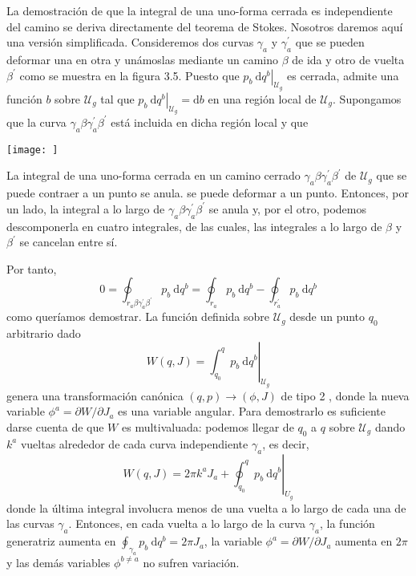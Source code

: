 La demostración de que la integral de una uno-forma cerrada es independiente del camino se deriva directamente del teorema de Stokes. Nosotros daremos aquí una versión simplificada. Consideremos dos curvas $\gamma_{a}$ y $\gamma_{a}^{\prime}$ que se pueden deformar una en otra y unámoslas mediante un camino $\beta$ de ida y otro de vuelta $\beta^{\prime}$ como se muestra en la figura 3.5. Puesto que $\left.p_{b} \mathrm{~d} q^{b}\right|_{\mathscr{U}_{g}}$ es cerrada, admite una función $b$ sobre $\mathscr{U}_{g}$ tal que $\left.p_{b} \mathrm{~d} q^{b}\right|_{\mathscr{U}_{g}}=\mathrm{d} b$ en una región local de $\mathscr{U}_{g}$. Supongamos que la curva $\gamma_{a} \beta \gamma_{a}^{\prime} \beta^{\prime}$ está incluida en dicha región local y que

\begin{marginfigure}[]
  \texttt{[image: ]}
  \caption[]{La integral de una uno-forma cerrada en un camino cerrado $\gamma_{a} \beta \gamma_{a}^{\prime} \beta^{\prime}$ de $\mathscr{U}_{g}$ que se puede contraer a un punto se anula.
  se puede deformar a un punto. Entonces, por un lado, la integral a lo largo de $\gamma_{a} \beta \gamma_{a}^{\prime} \beta^{\prime}$ se anula y, por el otro, podemos descomponerla en cuatro integrales, de las cuales, las integrales a lo largo de $\beta$ y $\beta^{\prime}$ se cancelan entre sí.}
\end{marginfigure} Por tanto,
$$
0=\oint_{r_{a} \beta \gamma_{a}^{\prime} \beta^{\prime}} p_{b} \mathrm{~d} q^{b}=\oint_{r_{a}} p_{b} \mathrm{~d} q^{b}-\oint_{r_{a}^{\prime}} p_{b} \mathrm{~d} q^{b}
$$
como queríamos demostrar.
La función definida sobre $\mathscr{U}_{g}$ desde un punto $q_{0}$ arbitrario dado
$$
W(q, J)=\left.\int_{q_{0}}^{q} p_{b} \mathrm{~d} q^{b}\right|_{\mathscr{U}_{g}}
$$
genera una transformación canónica $(q, p) \rightarrow(\phi, J)$ de tipo 2 , donde la nueva variable $\phi^{a}=\partial W / \partial J_{a}$ es una variable angular. Para demostrarlo es suficiente darse cuenta de que $W$ es multivaluada: podemos llegar de $q_{0}$ a $q$ sobre $\mathscr{U}_{g}$ dando $k^{a}$ vueltas alrededor de cada curva independiente $\gamma_{a}$, es decir,
$$
W(q, J)=2 \pi k^{a} J_{a}+\left.\oint_{q_{0}}^{q} p_{b} \mathrm{~d} q^{b}\right|_{U_{g}}
$$
donde la última integral involucra menos de una vuelta a lo largo de cada una de las curvas $\gamma_{a}$. Entonces, en cada vuelta a lo largo de la curva $\gamma_{a}$, la función generatriz aumenta en $\oint_{\gamma_{a}} p_{b} \mathrm{~d} q^{b}=2 \pi J_{a}$, la variable $\phi^{a}=\partial W / \partial J_{a}$ aumenta en $2 \pi$ y las demás variables $\phi^{b \neq a}$ no sufren variación.


